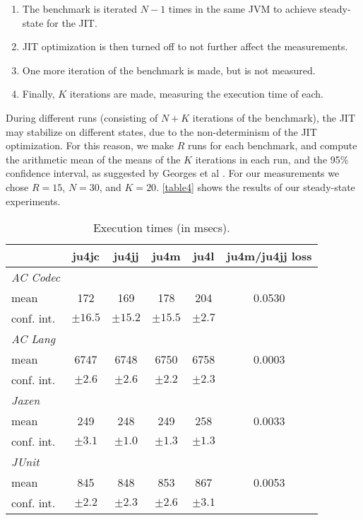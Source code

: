 {\begin{enumerate}
  \item The benchmark is iterated $N-1$ times in the same JVM to achieve steady-
    state for the JIT.
  \item JIT optimization is then turned off to not further affect the
    measurements.
  \item One more iteration of the benchmark is made, but is not measured.
  \item Finally, $K$ iterations are made, measuring the execution time of each.
\end{enumerate}

\noindent During different runs (consisting of $N+K$ iterations of the
benchmark), the JIT may stabilize on different states, due to the
non-determinism of the JIT optimization. For this reason, we make $R$ runs
for each benchmark, and compute the arithmetic mean of the means of the $K$
iterations in each run, and the 95\% confidence interval, as suggested by
Georges et al \cite{ref17}. For our measurements we chose $R=15$, $N=30$, and
$K=20$. \autoref{table4} shows the results of our steady-state experiments.

\begin{table}[h]
  \vspace{1em}
  \centering
\begin{tabular}{l|ccccc}
  \toprule
  & ju4jc & ju4jj & ju4m & ju4l & ju4m/ju4jj loss \\
  \hline
  \emph{AC Codec} & & & & & \\
  mean & 172 & 169 & 178 & 204 & 0.0530 \\
  conf. int. & $\pm16.5$ & $\pm15.2$ & $\pm15.5$ & $\pm2.7$ & \\
  \hline
  \emph{AC Lang} & & & & & \\
  mean & 6747 & 6748 & 6750 & 6758 & 0.0003 \\
  conf. int. & $\pm2.6$ & $\pm2.6$ & $\pm2.2$ & $\pm2.3$ & \\
  \hline
  \emph{Jaxen} & & & & & \\
  mean & 249 & 248 & 249 & 258 & 0.0033 \\
  conf. int. & $\pm3.1$ & $\pm1.0$ & $\pm1.3$ & $\pm1.3$ & \\
  \hline
  \emph{JUnit} & & & & & \\
  mean & 845 & 848 & 853 & 867 & 0.0053 \\
  conf. int. & $\pm2.2$ & $\pm2.3$ & $\pm2.6$ & $\pm3.1$ & \\
\end{tabular}
\caption{Execution times (in msecs).}
\label{table4}
\end{table}

}
